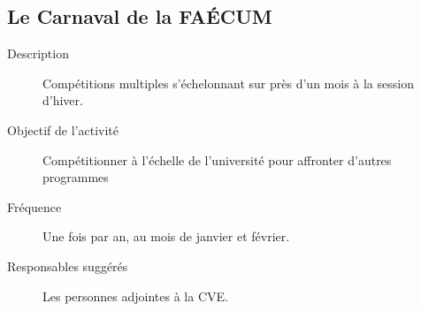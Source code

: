 \documentclass{aediroum}
\begin{document}
\subsection{Le Carnaval de la FAÉCUM}\label{sec:carnaval}

\begin{description}
    \item[Description] Compétitions multiples s'échelonnant sur près d'un mois à la session d'hiver.
    \item[Objectif de l'activité] Compétitionner à l'échelle de l'université pour affronter d'autres programmes
    \item[Fréquence] Une fois par an, au mois de janvier et février.
    \item[Responsables suggérés] Les personnes adjointes à la CVE.
\end{description}
\end{document}
